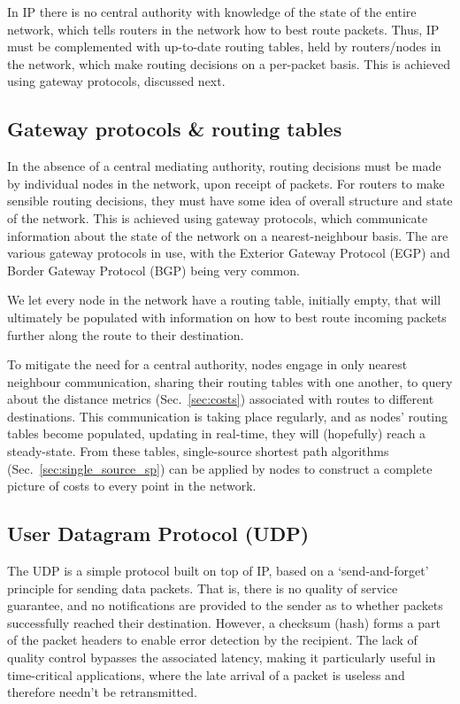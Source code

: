 \documentclass[aps,rmp,twocolumn,amsmath,amssymb,nofootinbib,superscriptaddress,longbibliography,floatfix]{revtex4-1}
\begin{document}
In IP there is no central authority with knowledge of the state of the entire network, which tells routers in the network how to best route packets. Thus, IP must be complemented with up-to-date routing tables, held by routers/nodes in the network, which make routing decisions on a per-packet basis. This is achieved using gateway protocols, discussed next.

%
%

\subsection{Gateway protocols \& routing tables} \label{sec:gateway}

In the absence of a central mediating authority, routing decisions must be made by individual nodes in the network, upon receipt of packets. For routers to make sensible routing decisions, they must have some idea of overall structure and state of the network. This is achieved using gateway protocols, which communicate information about the state of the network on a nearest-neighbour basis. The are various gateway protocols in use, with the Exterior Gateway Protocol (EGP) and Border Gateway Protocol (BGP) being very common.

We let every node in the network have a routing table, initially empty, that will ultimately be populated with information on how to best route incoming packets further along the route to their destination.

To mitigate the need for a central authority, nodes engage in only nearest neighbour communication, sharing their routing tables with one another, to query about the distance metrics (Sec.~\ref{sec:costs}) associated with routes to different destinations. This communication is taking place regularly, and as nodes' routing tables become populated, updating in real-time, they will (hopefully) reach a steady-state. From these tables, single-source shortest path algorithms (Sec.~\ref{sec:single_source_sp}) can be applied by nodes to construct a complete picture of costs to every point in the network.

%
%

\subsection{User Datagram Protocol (UDP)}

The UDP is a simple protocol built on top of IP, based on a `send-and-forget' principle for sending data packets. That is, there is no quality of service guarantee, and no notifications are provided to the sender as to whether packets successfully reached their destination. However, a checksum (hash) forms a part of the packet headers to enable error detection by the recipient. The lack of quality control bypasses the associated latency, making it particularly useful in time-critical applications, where the late arrival of a packet is useless and therefore needn't be retransmitted.
\end{document}
